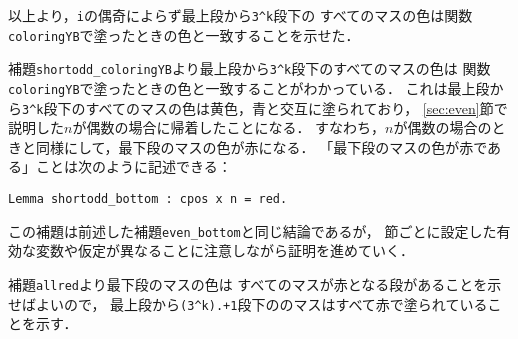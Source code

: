 以上より，{\tt{i}}の偶奇によらず最上段から{\tt{3\verb|^|k}}段下の
すべてのマスの色は関数{\tt{coloringYB}}で塗ったときの色と一致することを示せた．

補題{\tt{shortodd\_coloringYB}}より最上段から{\tt{3\verb|^|k}}段下のすべてのマスの色は
関数{\tt{coloringYB}}で塗ったときの色と一致することがわかっている．
これは最上段から{\tt{3\verb|^|k}}段下のすべてのマスの色は黄色，青と交互に塗られており，
\ref{sec:even}節で説明した$n$が偶数の場合に帰着したことになる．
すなわち，$n$が偶数の場合のときと同様にして，最下段のマスの色が赤になる．
「最下段のマスの色が赤である」ことは次のように記述できる：
\begin{lstlisting}[language=Coq]
  Lemma shortodd_bottom : cpos x n = red.
\end{lstlisting}
この補題は前述した補題{\tt{even\_bottom}}と同じ結論であるが，
節ごとに設定した有効な変数や仮定が異なることに注意しながら証明を進めていく．

補題{\tt{allred}}より最下段のマスの色は
すべてのマスが赤となる段があることを示せばよいので，
最上段から{\tt{(3\verb|^|k).+1}}段下ののマスはすべて赤で塗られていることを示す．


